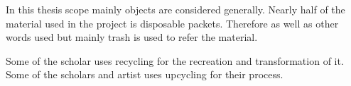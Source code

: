 
In this thesis scope mainly  objects are considered generally. Nearly half of the material used in the project is disposable packets. Therefore as well as other words used but mainly trash is used to refer the material. 

Some of the scholar uses recycling\cite{cerny1996recycled,herman1998trashformations} for the recreation and transformation of it. Some of the scholars and artist uses upcycling for their process. 

%
